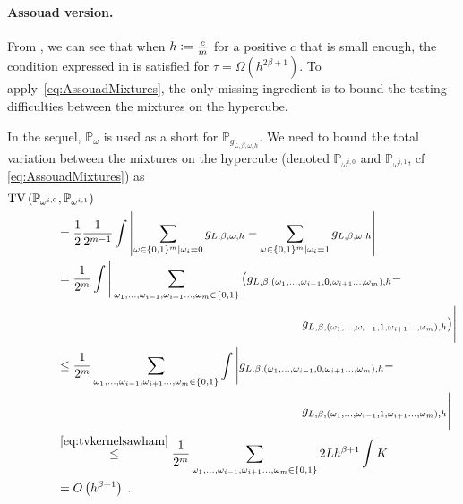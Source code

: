 \documentclass[10pt]{article} %
\newcommand{\Prob}[0]{\mathbb{P}}
\newcommand{\eqdef}{\vcentcolon=}
\newcommand\tv[2]{\mathrm{TV}\left( {#1}, {#2} \right)}
\newcommand\p[1]{\left( {#1}\right)}
\newcommand\RG[1]{\textcolor{red}{#1}}
\newcommand\CL[1]{\textcolor{blue}{#1}}
\begin{document}
\paragraph{Assouad version.}

From , we can see that when $h \eqdef \frac{c}{m}$ for a positive $c$ that is small enough, the condition expressed in  is satisfied for $\tau = \Omega(h^{2 \beta + 1})$. To apply~\eqref{eq:AssouadMixtures}, the only missing ingredient is to bound the testing difficulties between the mixtures on the hypercube.

In the sequel, $\Prob_{\omega}$ is used as a short for $\Prob_{g_{L, \beta, \omega, h}}$. We need to bound the total variation between the mixtures on the hypercube (denoted 
$\Prob_{\omega^{i, 0}}$ and $\Prob_{\omega^{i, 1}}$, cf \eqref{eq:AssouadMixtures})
as
\begin{equation*}
\begin{aligned}
&\tv{\Prob_{\omega^{i, 0}}}{\Prob_{\omega^{i, 1}}}\\
    &\quad\quad\quad\quad= \frac{1}{2} \frac{1}{2^{m-1}} \int \left| \sum_{\omega \in \{0, 1 \}^m | \omega_i = 0} g_{L, \beta, \omega, h} - \sum_{\omega \in \{0, 1 \}^m | \omega_i = 1} g_{L, \beta, \omega, h} \right| \\
    &\quad\quad\quad\quad= \frac{1}{2^m} \int \Bigg| \sum_{\omega_1, \dots, \omega_{i-1}, \omega_{i+1} \dots, \omega_{m} \in \{0, 1 \}} \big( g_{L, \beta, (\omega_1, \dots, \omega_{i-1}, 0, \omega_{i+1} \dots, \omega_{m}), h} - \\  
    &\quad\quad\quad\quad\quad\quad\quad\quad\quad\quad\quad\quad\quad\quad\quad\quad\quad\quad\quad\quad\quad\quad\quad\quad g_{L, \beta, (\omega_1, \dots, \omega_{i-1}, 1, \omega_{i+1} \dots, \omega_{m}), h} \big) \Bigg| \\
    &\quad\quad\quad\quad\leq \frac{1}{2^m} \sum_{\omega_1, \dots, \omega_{i-1}, \omega_{i+1} \dots, \omega_{m} \in \{0, 1 \}} \int \Bigg|   g_{L, \beta, (\omega_1, \dots, \omega_{i-1}, 0, \omega_{i+1} \dots, \omega_{m}), h} - \\  
    &\quad\quad\quad\quad\quad\quad\quad\quad\quad\quad\quad\quad\quad\quad\quad\quad\quad\quad\quad\quad\quad\quad\quad\quad g_{L, \beta, (\omega_1, \dots, \omega_{i-1}, 1, \omega_{i+1} \dots, \omega_{m}), h}  \Bigg| \\
     &\quad\quad\quad\quad\stackrel{\eqref{eq:tvkernelsawham}}{\leq} \frac{1}{2^m} \sum_{\omega_1, \dots, \omega_{i-1}, \omega_{i+1} \dots, \omega_{m} \in \{0, 1 \}}  2  L h^{\beta + 1} \int K \\
    &\quad\quad\quad\quad= O \p{h^{\beta + 1}}\;.
\end{aligned}  
\end{equation*}
\end{document}
